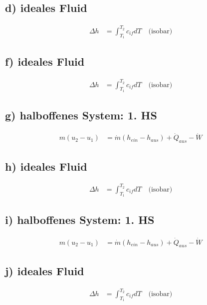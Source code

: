 

\subsection*{d) ideales Fluid}

\begin{align*}
    \Delta h &= \int_{T_1}^{T_2} c_{if} dT \quad \text{(isobar)}
\end{align*}

\subsection*{f) ideales Fluid}

\begin{align*}
    \Delta h &= \int_{T_1}^{T_2} c_{if} dT \quad \text{(isobar)}
\end{align*}

\subsection*{g) halboffenes System: 1. HS}

\begin{align*}
    m(u_2 - u_1) &= \dot{m} (h_{ein} - h_{aus}) + \dot{Q}_{aus} - \dot{W}
\end{align*}

\subsection*{h) ideales Fluid}

\begin{align*}
    \Delta h &= \int_{T_1}^{T_2} c_{if} dT \quad \text{(isobar)}
\end{align*}

\subsection*{i) halboffenes System: 1. HS}

\begin{align*}
    m(u_2 - u_1) &= \dot{m} (h_{ein} - h_{aus}) + \dot{Q}_{aus} - \dot{W}
\end{align*}

\subsection*{j) ideales Fluid}

\begin{align*}
    \Delta h &= \int_{T_1}^{T_2} c_{if} dT \quad \text{(isobar)}
\end{align*}


